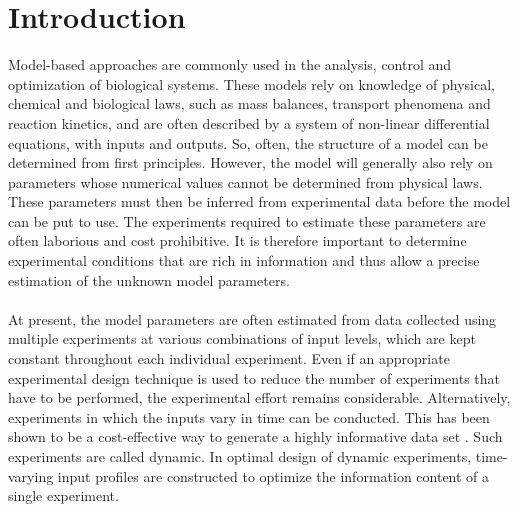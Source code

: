 \section{Introduction}
Model-based approaches are commonly used in the analysis, control and optimization of biological systems. These models rely on knowledge of physical, chemical and biological laws, such as mass balances, transport phenomena and reaction kinetics, and are often described by a system of non-linear differential equations, with inputs and outputs. So, often, the structure of a model can be determined from first principles. However, the model will generally also rely on parameters whose numerical values cannot be determined from physical laws. These parameters must then be inferred from experimental data before the model can be put to use. The experiments required to estimate these parameters are often laborious and cost prohibitive. It is therefore important to determine experimental conditions that are rich in information and thus allow a precise estimation of the unknown model parameters.
\\
\\
At present, the model parameters are often estimated from data collected using multiple experiments at various combinations of input levels, which are kept constant throughout each individual experiment. Even if an appropriate experimental design technique is used to reduce the number of experiments that have to be performed, the experimental effort remains considerable. Alternatively, experiments in which the inputs vary in time can be conducted. This has been shown to be a cost-effective way to generate a highly informative data set \parencite{versyck}. Such experiments are called dynamic. In optimal design of dynamic experiments, time-varying input profiles are constructed to optimize the information content of a single experiment.
\\
\\
